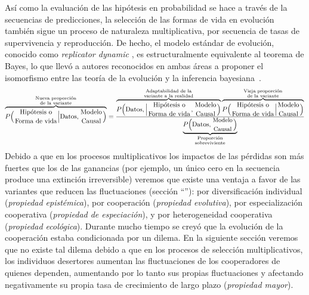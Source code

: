 \documentclass[a4paper,11pt]{book}
\newcommand\hfrac[2]{\genfrac{}{}{0pt}{}{#1}{#2}} %
\theoremstyle{definition}
\begin{document}
As\'i como la evaluaci\'on de las hip\'otesis en probabilidad se hace a trav\'es de la secuencias de predicciones, la selecci\'on de las formas de vida en evoluci\'on tambi\'en sigue un proceso de naturaleza multiplicativa, por secuencia de tasas de supervivencia y reproducci\'on.
%
De hecho, el modelo est\'andar de evoluci\'on, conocido como \emph{replicator dynamic} \cite{taylor1978-replicatorDynamic}, es estructuralmente equivalente al teorema de Bayes, lo que llev\'o a autores reconocidos en ambas \'areas a proponer el isomorfismo entre las teor\'ia de la evoluci\'on y la inferencia bayesiana~\cite{czegel2019-bayesianEvolution, czegel2022-bayesDarwin}.
%
\begin{equation*}
\overbrace{P\Big(\hfrac{\text{Hip\'otesis o}}{\text{Forma de vida}}  \Big| \text{Datos}, \hfrac{\text{Modelo}}{\text{Causal}} \Big)}^{\hfrac{\text{\scriptsize Nueva proporci\'on}}{\text{\scriptsize de la variante}}} = \frac{ \overbrace{P\Big(\text{Datos},  \Big|  \hfrac{\text{Hip\'otesis o}}{\text{Forma de vida}}  , \hfrac{\text{Modelo}}{\text{Causal}} \Big)}^{\hfrac{\text{\scriptsize Adaptabilidad de la}}{\text{\scriptsize variante a la realidad}}} \overbrace{P\Big(\hfrac{\text{Hip\'otesis o}}{\text{Forma de vida}} \Big|  \hfrac{\text{Modelo}}{\text{Causal}} \Big)}^{\hfrac{\text{\scriptsize Vieja proporci\'on}}{\text{\scriptsize de la variante}}}}{\underbrace{P\Big(\text{Datos},  \hfrac{\text{\small Modelo}}{\text{\small Causal}} \Big)}_{\hfrac{\text{\scriptsize Proporci\'on}}{\text{\scriptsize sobreviviente}}}}
\end{equation*}
%
Debido a que en los procesos multiplicativos los impactos de las p\'erdidas son m\'as fuertes que los de las ganancias (por ejemplo, un \'unico cero en la secuencia produce una extinci\'on irreversible) veremos que existe una ventaja a favor de las variantes que reducen las fluctuaciones (secci\'on ``''): por diversificaci\'on individual (\emph{propiedad epist\'emica}), por cooperaci\'on (\emph{propiedad evolutiva}), por especializaci\'on cooperativa (\emph{propiedad de especiaci\'on}), y por heterogeneidad cooperativa (\emph{propiedad ecol\'ogica}).
%
Durante mucho tiempo se crey\'o que la evoluci\'on de la cooperaci\'on estaba condicionada por un dilema.
%
En la siguiente secci\'on veremos que no existe tal dilema debido a que en los procesos de selecci\'on multiplicativos, los individuos desertores aumentan las fluctuaciones de los cooperadores de quienes dependen, aumentando por lo tanto sus propias fluctuaciones y afectando negativamente su propia tasa de crecimiento de largo plazo (\emph{propiedad mayor}).
\end{document}
